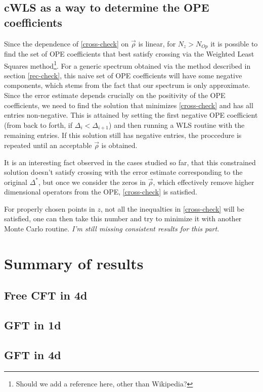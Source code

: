 \documentclass[letterpaper]{article}
\numberwithin{equation}{section}
\begin{document}
\subsection{cWLS as a way to determine the OPE coefficients}
\label{cWLS}
Since the dependence of \ref{cross-check} on $\vec{\rho}$ is linear, for
$N_z>N_{Op}$ it is possible to find the set of OPE coefficients that best
satisfy crossing via the Weighted Least Squares method\footnote{Should we add a
reference here, other than Wikipedia?}. 
For a generic spectrum
obtained via the method described in section \ref{rec-check}, this naive set of OPE
coefficients will have some negative components, which stems from the
fact that our spectrum is only approximate. Since the error estimate
\label{finalest4}
depends
crucially on the positivity of the OPE coefficients, we need to find the
solution that minimizes \ref{cross-check} and has all entries non-negative. This
is attained by setting the first negative OPE coefficient (from back to forth,
if $\Delta_i<\Delta_{i+1}$) and then running a WLS routine with the remaining
entries. If this solution still has negative entries, the proccedure is repeated
until an acceptable $\vec{\rho}$ is obtained.

It is an interesting fact observed in the cases studied so far, that this
constrained solution doesn't satisfy crossing with the error estimate
corresponding to the original $\Delta^*$, but once we consider the zeros in
$\vec{\rho}$, which effectively remove higher dimensional operators from the
OPE, \ref{cross-check} is satisfied.

For properly chosen
points in $z$, not all the inequalties in \ref{cross-check} will be satisfied,
one can then take this number and try to minimize it with another Monte Carlo
routine. \emph{I'm still missing consistent results for this part.}

\section{Summary of results}
\subsection{Free CFT in 4d}
\subsection{GFT in 1d}
\subsection{GFT in 4d}
\end{document}
